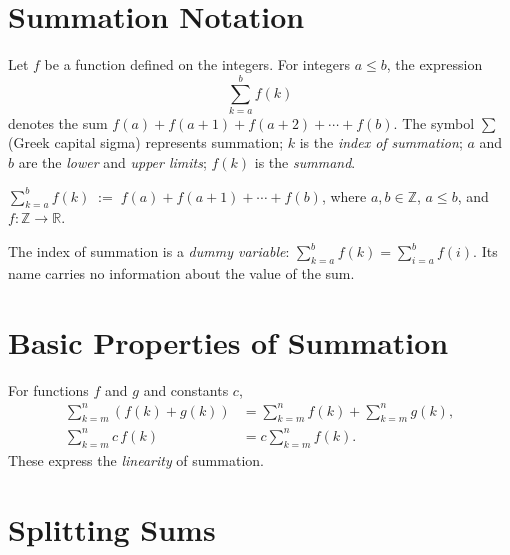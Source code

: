 
\section{Summation Notation}

\begin{tcolorbox}[colback=defbox, colframe=defborder, arc=2pt,
  left=6pt, right=6pt, top=4pt, bottom=4pt,
  title={\small\textbf{Definition (Summation)}},
  fonttitle=\small\bfseries]
Let \(f\) be a function defined on the integers.
For integers \(a \le b\), the expression
\[
\sum_{k=a}^{b} f(k)
\]
denotes the sum \(f(a) + f(a+1) + f(a+2) + \cdots + f(b)\).
The symbol \(\sum\) (Greek capital sigma) represents summation;
\(k\) is the \emph{index of summation}; \(a\) and \(b\) are the
\emph{lower} and \emph{upper limits}; \(f(k)\) is the \emph{summand}.
\end{tcolorbox}
\label{def:summation}

\begin{remark*}
\(\displaystyle\sum_{k=a}^{b} f(k) \;:=\; f(a) + f(a+1) + \cdots + f(b)\),
where \(a,b \in \mathbb{Z}\), \(a \le b\), and \(f : \mathbb{Z}\to\mathbb{R}\).
\end{remark*}

\begin{remark*}
The index of summation is a \emph{dummy variable}:
\(\displaystyle\sum_{k=a}^{b} f(k) = \sum_{i=a}^{b} f(i)\).
Its name carries no information about the value of the sum.
\end{remark*}

\section*{Basic Properties of Summation}

For functions \(f\) and \(g\) and constants \(c\),
\begin{align*}
\sum_{k=m}^{n} (f(k) + g(k))
&=
\sum_{k=m}^{n} f(k)
+
\sum_{k=m}^{n} g(k), \\[6pt]
\sum_{k=m}^{n} c\,f(k)
&=
c \sum_{k=m}^{n} f(k).
\end{align*}
These express the \emph{linearity} of summation.

\section*{Splitting Sums}

